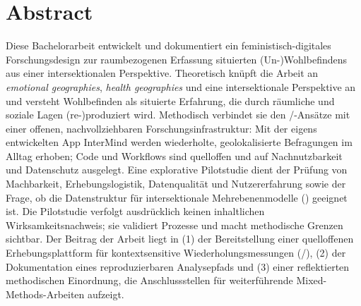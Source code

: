 
\chapter*{Abstract}

Diese Bachelorarbeit entwickelt und dokumentiert ein feministisch-digitales Forschungsdesign zur raumbezogenen Erfassung situierten (Un\nobreakdash-)Wohl\-be\-find\-ens aus einer intersektionalen Perspektive. Theoretisch knüpft die Arbeit an \emph{emotional geographies}, \emph{health geographies} und eine intersektionale Perspektive an und versteht Wohlbefinden als situierte Erfahrung, die durch räumliche und soziale Lagen (re-)produziert wird. Methodisch verbindet sie den /-Ansätze mit einer offenen, nachvollziehbaren Forschungsinfrastruktur: Mit der eigens entwickelten App InterMind werden wiederholte, geolokalisierte Befragungen im Alltag erhoben; Code und Workflows sind quelloffen und auf Nachnutzbarkeit und Datenschutz ausgelegt. Eine explorative Pilotstudie dient der Prüfung von Machbarkeit, Erhebungslogistik, Datenqualität und Nutzererfahrung sowie der Frage, ob die Datenstruktur für intersektionale Mehrebenenmodelle () geeignet ist. Die Pilotstudie verfolgt ausdrücklich keinen inhaltlichen Wirksamkeitsnachweis; sie validiert Prozesse und macht methodische Grenzen sichtbar. Der Beitrag der Arbeit liegt in (1) der Bereitstellung einer quelloffenen  Erhebungsplattform für kontextsensitive Wiederholungsmessungen (/), (2) der Dokumentation eines reproduzierbaren Analysepfads und (3) einer reflektierten methodischen Einordnung, die Anschlussstellen für weiterführende Mixed-Methods-Arbeiten aufzeigt.